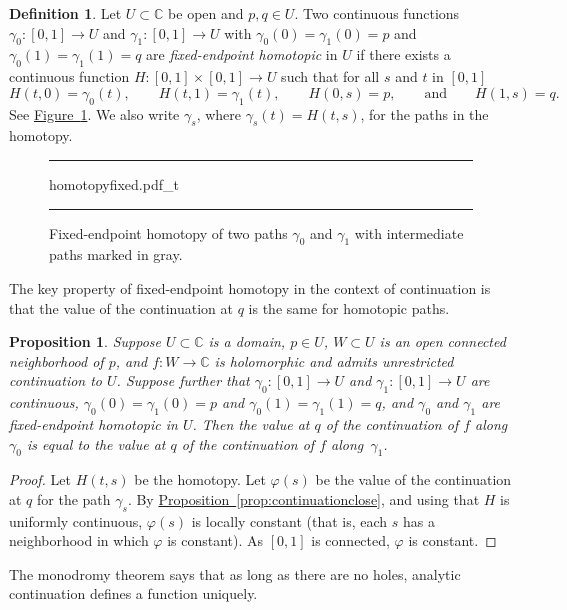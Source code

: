 \documentclass[12pt,openany]{book}
\newcommand{\C}{{\mathbb{C}}}
\newcommand{\myindex}[1]{#1\index{#1}}
\theoremstyle{plain}
\newtheorem{prop}[thm]{Proposition}
\theoremstyle{remark}
\theoremstyle{definition}
\newtheorem{defn}[thm]{Definition}
\newenvironment{myfig}{%
\begin{figure}[h!t]
\noindent\rule{\textwidth}{0.5pt}\vspace{12pt}\par\centering}%
{\par\noindent\rule{\textwidth}{0.5pt}
\end{figure}}
\theoremstyle{exercise}
\theoremstyle{example}
\newcommand{\figureref}[1]{\hyperref[#1]{Figure~\ref*{#1}}}
\newcommand{\propref}[1]{\hyperref[#1]{Proposition~\ref*{#1}}}
\begin{document}
\begin{defn}
Let $U \subset \C$ be open and $p,q \in U$.
Two continuous functions
$\gamma_0 \colon [0,1] \to U$ and
$\gamma_1 \colon [0,1] \to U$ with
$\gamma_0(0)=\gamma_1(0)=p$
and
$\gamma_0(1)=\gamma_1(1)=q$
are
\emph{\myindex{fixed-endpoint homotopic}} in $U$
if there exists a continuous function
$H \colon [0,1] \times [0,1] \to U$ such that
for all $s$ and $t$ in $[0,1]$
\begin{equation*}
H(t,0) = \gamma_0(t), \qquad
H(t,1) = \gamma_1(t), \qquad
H(0,s) = p, \qquad
\text{and} \qquad
H(1,s) = q .
\end{equation*}
See \figureref{fig:homotopyfixed}.
We also write $\gamma_s$, where $\gamma_s(t) = H(t,s)$, for the paths in the homotopy.
\end{defn}

\begin{myfig}
{homotopyfixed.pdf_t}
\caption{Fixed-endpoint homotopy of two paths $\gamma_0$ and
$\gamma_1$ with intermediate paths marked in gray.\label{fig:homotopyfixed}}
\end{myfig}

The key property of fixed-endpoint homotopy in the context of continuation is that 
the value of the continuation at $q$ is the same for homotopic paths.

\begin{prop}
\pagebreak[2]
Suppose $U \subset \C$ is a domain,
$p \in U$,
$W \subset U$ is an open connected neighborhood of $p$,
and $f \colon W \to \C$ is holomorphic and admits unrestricted continuation
to $U$.  Suppose further that
$\gamma_0 \colon [0,1] \to U$ and
$\gamma_1 \colon [0,1] \to U$ are continuous, $\gamma_0(0)=\gamma_1(0)=p$
and
$\gamma_0(1)=\gamma_1(1)=q$, and $\gamma_0$ and $\gamma_1$ are fixed-endpoint
homotopic in $U$.
Then the value at $q$ of the continuation of $f$ along $\gamma_0$ is equal to the
value at $q$ of the continuation of $f$ along~$\gamma_1$.
\end{prop}

\begin{proof}
Let $H(t,s)$ be the homotopy.
Let $\varphi(s)$ be the value of the continuation at $q$ for the path
$\gamma_s$.
By \propref{prop:continuationclose}, and using that
$H$ is uniformly continuous, $\varphi(s)$ is locally constant (that
is, each $s$ has a neighborhood in which $\varphi$ is constant).  
As $[0,1]$ is connected, $\varphi$ is constant.
\end{proof}

The monodromy theorem says that as long as there are
no holes, analytic continuation defines a function uniquely.
\end{document}
